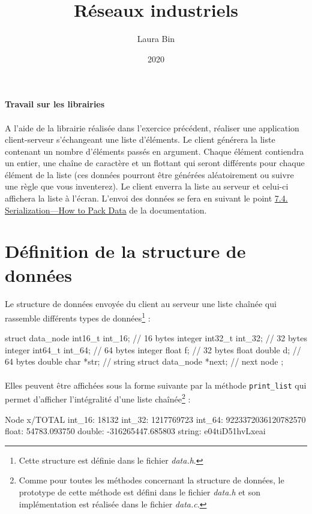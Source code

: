 \documentclass{article}
\title{Réseaux industriels}
\date{2020}
\author{Laura Bin}
\begin{document}

    \begin{center}
        \textbf{\LARGE Travail sur les librairies}
    \end{center}

    \paragraph{}
    A l’aide de la librairie réalisée dans l’exercice précédent, réaliser une application client-serveur s’échangeant une liste d’éléments. Le client générera la liste contenant un nombre d’éléments passés en argument. Chaque élément contiendra un entier, une chaîne de caractère et un flottant qui seront différents pour chaque élément de la liste (ces données pourront être générées aléatoirement ou suivre une règle que vous inventerez). Le client enverra la liste au serveur et celui-ci affichera la liste à l’écran. L’envoi des données se fera en suivant le point \href{https://beej.us/guide/bgnet/html/#serialization}{7.4. Serialization—How to Pack Data} de la documentation.


    \section{Définition de la structure de données}
    \paragraph{}
    Le structure de données envoyée du client au serveur une liste chaînée qui rassemble différents types de données\footnote{Cette structure est définie dans le fichier \emph{data.h}.} :
    \begin{verbatimtab}
        struct data_node {
            int16_t int_16;             // 16 bytes integer
            int32_t int_32;             // 32 bytes integer
            int64_t int_64;             // 64 bytes integer
            float   f;                  // 32 bytes float
            double  d;                  // 64 bytes double
            char    *str;               // string
            struct data_node *next;     // next node
            };
    \end{verbatimtab}

    \paragraph{}
    Elles peuvent être affichées sous la forme suivante par la méthode \texttt{print\_list} qui permet d'afficher l'intégralité d'une liste chaînée\footnote{Comme pour toutes les méthodes concernant la structure de données, le prototype de cette méthode est défini dans le fichier \emph{data.h} et son implémentation est réalisée dans le fichier \emph{data.c}.} :
    \begin{verbatimtab}
        Node x/TOTAL {
            int_16: 18132
            int_32: 1217769723
            int_64: 9223372036120782570
            float:  54783.093750
            double: -316265447.685803
            string: e04tiD51hvLxeai
        }
    \end{verbatimtab}
\end{document}
